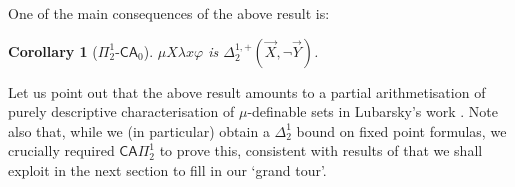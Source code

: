 \documentclass[10pt,a4paper]{amsart}
\theoremstyle{plain}
\newtheorem{proposition}[proposition]{Proposition}
\newtheorem{corollary}[corollary]{Corollary}
\theoremstyle{definition}
\renewcommand{\phi}{\varphi}
\newcommand{\anupam}[1]{\todo[color=green]{A: #1}}
\renewcommand{\todo}[1]{}
\renewcommand{\anupam}[1]{}
\theoremstyle{plain}
\theoremstyle{definition} %
\renewcommand{\land}{\wedge}
\newcommand{\limp}{\to}
\newcommand{\liff}{\leftrightarrow}
\newcommand{\mufo}[3]{\mu #1 \lambda #2 #3}
\newcommand{\nufo}[3]{\nu #1 \lambda #2 #3}
\newcommand{\Sin}[2]{\Sigma^{#1}_{#2}}
\newcommand{\Pin}[2]{\Pi^{#1}_{#2}}
\newcommand{\Din}[2]{\Delta^{#1}_{#2}}
\newcommand{\posDin}[3]{\Din{#1,+}{#2} (#3)}
\newcommand{\posnegDin}[4]{\posDin{#1}{#2}{#3, \lnot #4}}
\newcommand{\CA}{\mathsf{CA}}
\newcommand{\ca}[1]{#1\text{-}\CA}
\newcommand{\PSCA}{\ca{\Pin 1 2 }_0}
\newcommand{\ACA}{\mathsf{ACA}_0}
\begin{document}
One of the main consequences of the above result is:
\begin{corollary}
    [$\PSCA$]
    \label{cor:lfp-of-posD12-is-posD12}
    $\mufo X x \phi$ is $\posnegDin 1 2 {\vec X}{\vec Y}$.
\end{corollary}

\anupam{commented old nu stuff below. obsolete.}








Let us point out that the above result amounts to a partial arithmetisation of purely descriptive characterisation of $\mu$-definable sets in Lubarsky's work \cite{Lubarsky93}.
Note also that, while we (in particular) obtain a $\Delta^1_2$ bound on fixed point formulas, we crucially required $\CA{\Pi^1_2}$ to prove this, consistent with results of \cite{Moellerfeld02:phd-thesis} that we shall exploit in the next section to fill in our `grand tour'. 
\end{document}
